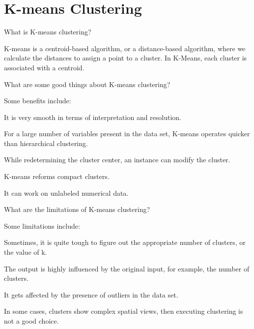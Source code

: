 	\section{K-means Clustering}

	\resetquestioncounter{}

	\begin{qanda}
		\begin{question}
What is K-means clustering?
		\end{question}

		\begin{answer}
K-means is a centroid-based algorithm, or a distance-based algorithm, where we calculate the distances to assign a point to a cluster. In K-Means, each cluster is associated with a centroid.
		\end{answer}
	\end{qanda}

	\begin{qanda}
	\begin{question}
What are some good things about K-means clustering?
	\end{question}

	\begin{answer}
Some benefits include:
	\begin{bulletedlist}
		\item It is very smooth in terms of interpretation and resolution.
		\item For a large number of variables present in the data set, K-means operates quicker than hierarchical clustering.
		\item While redetermining the cluster center, an instance can modify the cluster.
		\item K-means reforms compact clusters.
		\item It can work on unlabeled numerical data.
	\end{bulletedlist}
	\end{answer}
	\end{qanda}

	\begin{qanda}
		\begin{question}
What are the limitations of K-means clustering?
		\end{question}

		\begin{answer}
Some limitations include:
	\begin{bulletedlist}
		\item Sometimes, it is quite tough to figure out the appropriate number of clusters, or the value of k.
		\item The output is highly influenced by the original input, for example, the number of clusters.
		\item It gets affected by the presence of outliers in the data set.
		\item In some cases, clusters show complex spatial views, then executing clustering is not a good choice.
	\end{bulletedlist}
		\end{answer}
	\end{qanda}

